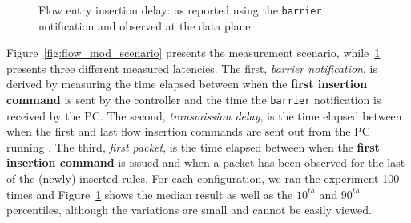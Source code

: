 \begin{figure}[ht]
  \begin{center}
  \end{center}
  \caption[Flow entry insertion delay]{Flow entry insertion delay: as reported using the
    \texttt{barrier} notification and observed at the data
    plane.}
  \label{fig:flow_insertion_comparison}
\end{figure}


Figure~\ref{fig:flow_mod_scenario} presents the measurement scenario,
while~\ref{fig:flow_insertion_comparison} presents three different measured
latencies.  The first, {\it barrier notification}, is derived by measuring the
time elapsed between when the \textbf{first insertion command} is sent by the \oflops
controller and the time the \texttt{barrier} notification is received by the
PC\@. The second, {\it transmission delay}, is the time elapsed between when the first and
last flow insertion commands are sent out from the PC running \oflops.  The
third, {\it first packet}, is the time elapsed between when the \textbf{first insertion
  command} is issued and when a packet has been observed for the last of the (newly)
inserted rules. For each configuration, we ran the experiment 100 times and
Figure~\ref{fig:flow_insertion_comparison} shows the median result as well as
the $10^{th}$ and $90^{th}$ percentiles, although the variations are small and
cannot be easily viewed.


